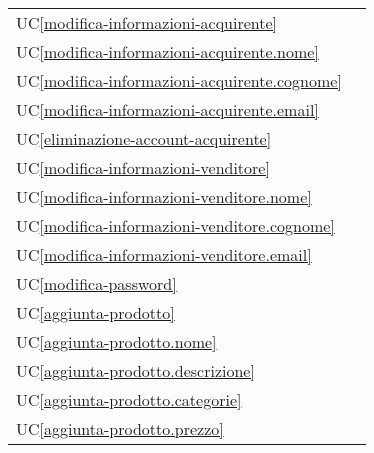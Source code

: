 \begin{longtable}{C{6cm} C{6cm}}
	UC\ref{modifica-informazioni-acquirente} &  \\

    UC\ref{modifica-informazioni-acquirente.nome} &  \\

	UC\ref{modifica-informazioni-acquirente.cognome} &  \\

    UC\ref{modifica-informazioni-acquirente.email} &  \\

    UC\ref{eliminazione-account-acquirente} &  \\

	UC\ref{modifica-informazioni-venditore} &  \\

    UC\ref{modifica-informazioni-venditore.nome} &  \\

    UC\ref{modifica-informazioni-venditore.cognome} &  \\

	UC\ref{modifica-informazioni-venditore.email} &  \\

    UC\ref{modifica-password} &  \\

    UC\ref{aggiunta-prodotto} &  \\

	UC\ref{aggiunta-prodotto.nome} &  \\

    UC\ref{aggiunta-prodotto.descrizione} &  \\

	UC\ref{aggiunta-prodotto.categorie} &  \\

    UC\ref{aggiunta-prodotto.prezzo} &  \\


\end{longtable}
